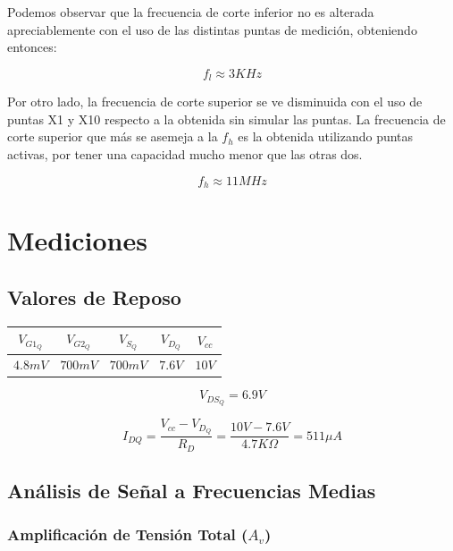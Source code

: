 \documentclass[a4paper, 10pt, spanish]{article}
\begin{document}
Podemos observar que la frecuencia de corte inferior no es alterada apreciablemente con el uso de las distintas puntas de medición, obteniendo entonces:

\begin{equation}
  f_l \approx 3KHz
\end{equation}

Por otro lado, la frecuencia de corte superior se ve disminuida con el uso de puntas X1 y X10 respecto a la obtenida sin simular las puntas. La frecuencia de corte superior que más se asemeja a la $f_h$ es la obtenida utilizando puntas activas, por tener una capacidad mucho menor que las otras dos.

\begin{equation}
  f_h \approx 11MHz
\end{equation}

\section{Mediciones}

\subsection{Valores de Reposo}

\begin{center}
  \begin{tabular}{|c|c|c|c|c|}
    \hline
    $V_{G1_Q}$ & $V_{G2_Q}$ & $V_{S_Q}$ & $V_{D_Q}$ & $V_{cc}$ \\
    \hline
    $4.8mV$ & $700mV$ & $700mV$ & $7.6V$ & $10V$ \\
    \hline
  \end{tabular}
  \label{tab:valores_reposo_med}
\end{center}

\begin{equation}
  V_{DS_Q} = 6.9V
\end{equation}

\begin{equation}
  I_{DQ} = \frac{V_{cc} - V_{D_Q}}{R_D} = \frac{10V - 7.6V}{4.7K\Omega} = 511 \mu A
\end{equation}

\subsection{Análisis de Señal a Frecuencias Medias}

\subsubsection{Amplificación de Tensión Total ($A_v$)}
\end{document}
